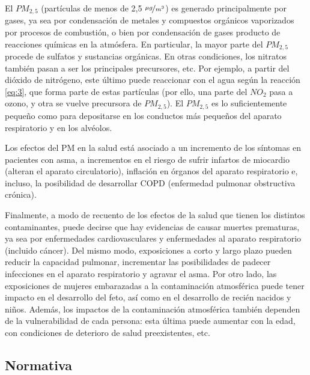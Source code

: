 \documentclass[12pt]{article}
\begin{document}
El $PM_{2,5}$ (partículas de menos de 2,5 $\nicefrac{\mu g}{m^3}$) es generado principalmente por gases, ya sea por condensación de metales y compuestos orgánicos vaporizados por procesos de combustión, o bien por condensación de gases producto de reacciones químicas en la atmósfera. En particular, la mayor parte del $PM_{2,5}$ procede de sulfatos y sustancias orgánicas. En otras condiciones, los nitratos también pasan a ser los principales precursores, etc. Por ejemplo, a partir del dióxido de nitrógeno, este último puede reaccionar con el agua según la reacción \ref{eq:3}, que forma parte de estas partículas (por ello, una parte del $NO_{2}$ pasa a ozono, y otra se vuelve precursora de $PM_{2,5}$). El $PM_{2,5}$ es lo suficientemente pequeño como para depositarse en los conductos más pequeños del aparato respiratorio y en los alvéolos.

Los efectos del PM en la salud está asociado a un incremento de los síntomas en pacientes con asma, a incrementos en el riesgo de sufrir infartos de miocardio (alteran el aparato circulatorio), inflación en órganos del aparato respiratorio e, incluso, la posibilidad de desarrollar COPD (enfermedad pulmonar obstructiva crónica).

Finalmente, a modo de recuento de los efectos de la salud que tienen los distintos contaminantes, puede decirse que hay evidencias de causar muertes prematuras, ya sea por enfermedades cardiovasculares y enfermedades al aparato respiratorio (incluido cáncer). Del mismo modo, exposiciones a corto y largo plazo pueden reducir la capacidad pulmonar, incrementar las posibilidades de padecer infecciones en el aparato respiratorio y agravar el asma. Por otro lado, las exposiciones de mujeres embarazadas a la contaminación atmosférica puede tener impacto en el desarrollo del feto, así como en el desarrollo de recién nacidos y niños. Además, los impactos de la contaminación atmosférica también dependen de la vulnerabilidad de cada persona: esta última puede aumentar con la edad, con condiciones de deterioro de salud preexistentes, etc.

\subsection{Normativa}
\end{document}
